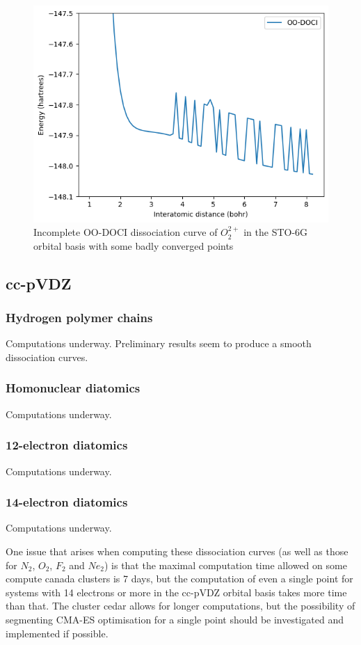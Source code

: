 \documentclass[twoside,twocolumn,9pt]{article}
\begin{document}
\begin{figure}
  \includegraphics[width=\linewidth]{O2++.png}
  \caption{Incomplete OO-DOCI dissociation curve of $O_2^{2+}$ in the STO-6G orbital basis with some badly converged points}\label{O2++}
\end{figure}

\subsection{cc-pVDZ}
\subsubsection{Hydrogen polymer chains}
Computations underway. Preliminary results seem to produce a smooth dissociation curves.

\subsubsection{Homonuclear diatomics}
Computations underway.

\subsubsection{12-electron diatomics}
Computations underway.

\subsubsection{14-electron diatomics}
Computations underway.

One issue that arises when computing these dissociation curves (as well as those for $N_2$, $O_2$, $F_2$ and $Ne_2$) is that the maximal computation time allowed on some compute canada clusters is 7 days, but the computation of even a single point for systems with 14 electrons or more in the cc-pVDZ orbital basis takes more time than that. The cluster cedar allows for longer computations, but the possibility of segmenting CMA-ES optimisation for a single point should be investigated and implemented if possible. 
\end{document}

